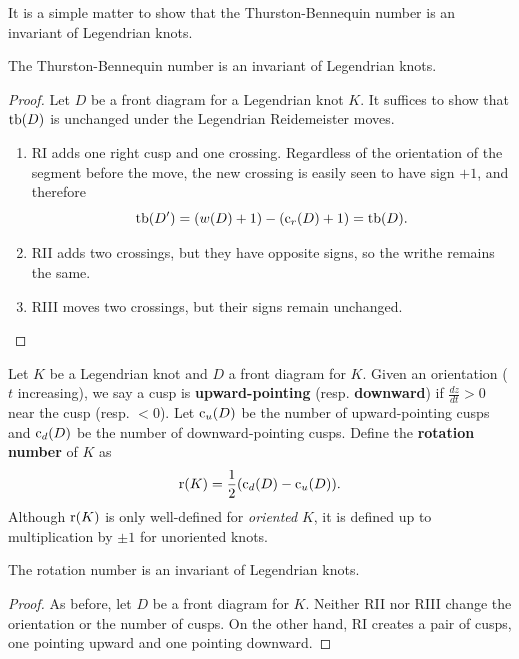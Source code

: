 It is a simple matter to show that the Thurston-Bennequin number is an invariant of Legendrian knots.

\begin{proposition}
    The Thurston-Bennequin number is an invariant of Legendrian knots.
\end{proposition}
\begin{proof}
    Let $D$ be a front diagram for a Legendrian knot $K$. It suffices to show that $\operatorname{tb}(D)$ is unchanged under the Legendrian Reidemeister moves.

    \begin{enumerate}
        \item RI adds one right cusp and one crossing. Regardless of the orientation of the segment before the move, the new crossing is easily seen to have sign $+1$, and therefore
            \[
                \operatorname{tb}(D') = (w(D) + 1) - (\operatorname{c}_r(D) + 1) = \operatorname{tb}(D).
            \]
        \item RII adds two crossings, but they have opposite signs, so the writhe remains the same.
        \item RIII moves two crossings, but their signs remain unchanged.
    \end{enumerate}
    
\end{proof}

\begin{definition}
    Let $K$ be a Legendrian knot and $D$ a front diagram for $K$.
    Given an orientation ($t$ increasing), we say a cusp is \textbf{upward-pointing} (resp. \textbf{downward}) if $\frac{dz}{dt} > 0$ near the cusp (resp. $< 0$).
    Let $\operatorname{c}_u(D)$ be the number of upward-pointing cusps and $\operatorname{c}_d(D)$ be the number of downward-pointing cusps. Define the \textbf{rotation number} of $K$ as 
    \[
        \operatorname{r}(K) = \frac{1}{2} (\operatorname{c}_d(D) - \operatorname{c}_u(D)).
    \]
    Although $\operatorname{r}(K)$ is only well-defined for \emph{oriented} $K$, it is defined up to multiplication by $\pm 1$ for unoriented knots.
\end{definition}
\begin{proposition}
    The rotation number is an invariant of Legendrian knots.
\end{proposition}
\begin{proof}
    As before, let $D$ be a front diagram for $K$. Neither RII nor RIII change the orientation or the number of cusps. On the other hand, RI creates a pair of cusps, one pointing upward and one pointing downward.
\end{proof}


